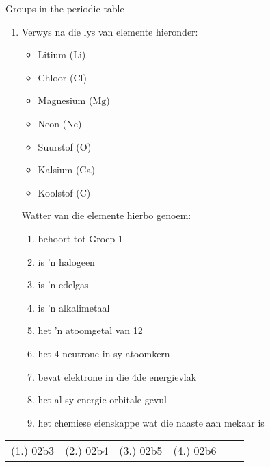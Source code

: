 \begin{exercises}{Groups in the periodic table}
{\begin{enumerate}[noitemsep, label=\textbf{\arabic*}. ]
\item            \label{m38760*id262476}Verwys na die lys van elemente hieronder: \label{m38760*id7632}\begin{itemize}[noitemsep]
            \item Litium ($\mathrm{Li}$)\item Chloor ($\mathrm{Cl}$)\item Magnesium ($\mathrm{Mg}$)\item Neon ($\mathrm{Ne}$)\item Suurstof ($\mathrm{O}$)\item Kalsium ($\mathrm{Ca}$)\item Koolstof ($\mathrm{C}$)\end{itemize}
        Watter van die elemente hierbo genoem:
        \label{m38760*id262499}\begin{enumerate}[noitemsep, label=\textbf{\alph*}. ] 
            \label{m38760*uid158}\item behoort tot Groep 1
\label{m38760*uid159}\item is 'n halogeen
\label{m38760*uid160}\item is 'n edelgas
\label{m38760*uid161}\item is 'n alkalimetaal
\label{m38760*uid162}\item het 'n atoomgetal van 12
\label{m38760*uid163}\item het 4 neutrone in sy atoomkern
\label{m38760*uid164}\item bevat elektrone in die 4de energievlak
\label{m38760*uid166}\item het al sy energie-orbitale gevul
\label{m38760*uid167}\item het chemiese eienskappe wat die naaste aan mekaar is
\end{enumerate}
\end{enumerate}

\practiceinfo
 \par \begin{tabular}[h]{cccccc}
 (1.) 02b3  & (2.) 02b4 & (3.) 02b5 & (4.) 02b6 \end{tabular}
}
\end{exercises}

